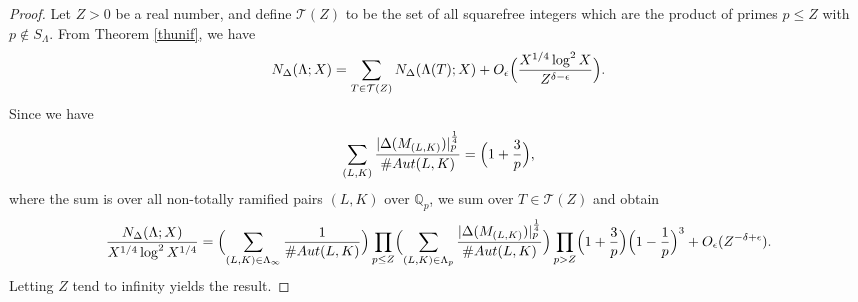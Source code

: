 \documentclass[10pt,a4paper]{amsart}
\def\Aut{{\rm Aut}}
\def\Q{{\mathbb Q}}
\def\cT{{\mathcal T}}
\begin{document}
\begin{proof}
Let $Z>0$ be a real number, and define $\cT(Z)$ to be the set of all
squarefree integers which are the product of primes $p\leq Z$ with
$p\not\in S_\Lambda$. From Theorem \ref{thunif}, we have
\begin{equation*}
N_\Delta(\Lambda;X)=\sum_{T\in\cT(Z)}N_\Delta(\Lambda(T);X)+O_\epsilon
\Bigl(\frac{X^{1/4}\log^2 X}{Z^{\delta-\epsilon}}\Bigr).
\end{equation*}
Since we have
\begin{equation*}
\sum_{(L,K)}\frac{|\Delta(M_{(L,K)})|_p^{\frac14}}{\#\Aut(L,K)}=
\Bigl(1+\frac{3}{p}\Bigr),
\end{equation*}
where the sum is over all non-totally ramified pairs $(L,K)$ over
$\Q_p$, we sum over $T\in\cT(Z)$ and obtain
\begin{equation*}
\begin{array}{rcl}
\displaystyle \frac{N_\Delta(\Lambda;X)}{X^{1/4}\log^2 X^{1/4}}=
\displaystyle\Bigl(\sum_{(L,K)\in\Lambda_\infty}
\frac{1}{\#\Aut(L,K)}\Bigr)
\prod_{p\leq Z}\Bigl(\sum_{(L,K)\in\Lambda_p}
\frac{|\Delta(M_{(L,K)})|_p^{\frac14}}{\#\Aut(L,K)}\Bigr)
\prod_{p>Z}\Bigl(1+\frac{3}{p}\Bigr)\Bigl(1-\frac{1}{p}\Bigr)^3
+O_\epsilon(Z^{-\delta+\epsilon}).
\end{array}
\end{equation*}
Letting $Z$ tend to infinity yields the result.
\end{proof}
\end{document}
